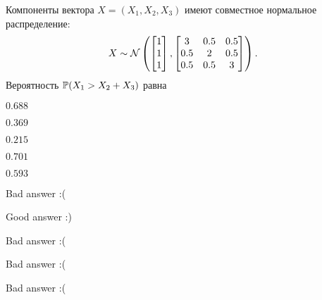 
\begin{question}
Компоненты вектора \(X=(X_{1},X_{2},X_{3})\) имеют совместное нормальное
распределение: \[
X\sim\cN \left(
\begin{bmatrix}1\\1\\1\end{bmatrix},
\begin{bmatrix}3 & 0.5 & 0.5\\0.5 & 2 & 0.5\\0.5 & 0.5 & 3\end{bmatrix}
\right).
\] Вероятность \(\P(X_{1}>X_{2}+X_{3} )\) равна
\begin{answerlist}
  \item \(0.688\)
  \item \(0.369\)
  \item \(0.215\)
  \item \(0.701\)
  \item \(0.593\)
\end{answerlist}
\end{question}

\begin{solution}
\begin{answerlist}
  \item Bad answer :(
  \item Good answer :)
  \item Bad answer :(
  \item Bad answer :(
  \item Bad answer :(
\end{answerlist}
\end{solution}

